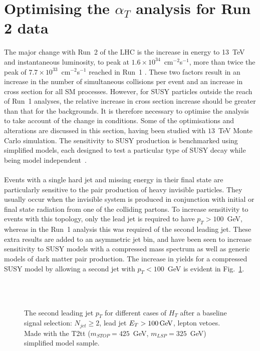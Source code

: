 
\section{Optimising the $\alpha_T$ analysis for Run 2 data}
\label{sec:analysisOptimisation}

The major change with Run~2 of the LHC is the increase in energy to 13~TeV and instantaneous luminosity, to peak at $1.6\times10^{34}$~cm$^{-2}$s$^{-1}$, more than twice the peak of $7.7\times10^{33}$~cm$^{-2}$s$^{-1}$ reached in Run~1 \cite{LHCLuminosityIPAC13}. These two factors result in an increase in the number of simultaneous collisions per event and an increase in cross section for all SM processes. However, for SUSY particles outside the reach of Run~1 analyses, the relative increase in cross section increase should be greater than that for the backgrounds. It is therefore necessary to optimise the analysis to take account of the change in conditions. Some of the optimisations and alterations are discussed in this section, having been studied with $13$~TeV Monte Carlo simulation. The sensitivity to SUSY production is benchmarked using simplified models, each designed to test a particular type of SUSY decay while being model independent~\cite{SimplifiedModelsAlves:2011wf}.
\\\\
Events with a single hard jet and missing energy in their final state are particularly sensitive to the pair production of heavy invisible particles. They usually occur when the invisible system is produced in conjunction with initial or final state radiation from one of the colliding partons. To increase sensitivity to events with this topology, only the lead jet is required to have $p_T>100$~GeV, whereas in the Run~1 analysis this was required of the second leading jet. These extra results are added to an asymmetric jet bin, and have been seen to increase sensitivity to SUSY models with a compressed mass spectrum as well as generic models of dark matter pair production. The increase in yields for a compressed SUSY model by allowing a second jet with $p_T<100$~GeV is evident in Fig.~\ref{fig:asymMotivation}.
\\\\
\begin{figure}[h!]
  \centering
  ~~
  \\
  \caption{\label{fig:asymMotivation} The second leading jet $p_T$ for different
  cases of $H_T$ after a baseline signal selection: $N_{jet}\geq2$, lead jet
  $E_T>100\mathrm{\,Ge\kern -0.1em V}$, lepton vetoes. Made with the T2tt ($m_{STOP}=425$~GeV, $m_{LSP}=325$~GeV) simplified model sample.}
\end{figure}

